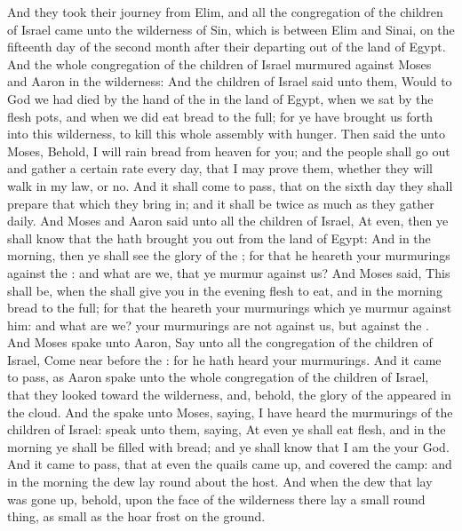 \begin{biblechapter} %
 And they took their journey from Elim, and all the congregation of the children of Israel came unto the wilderness of Sin, which is between Elim and Sinai, on the fifteenth day of the second month after their departing out of the land of Egypt.
\verse And the whole congregation of the children of Israel murmured against Moses and Aaron in the wilderness:
\verse And the children of Israel said unto them, Would to God we had died by the hand of the \LORD in the land of Egypt, when we sat by the flesh pots, and when we did eat bread to the full; for ye have brought us forth into this wilderness, to kill this whole assembly with hunger.
\verse Then said the \LORD unto Moses, Behold, I will rain bread from heaven for you; and the people shall go out and gather a certain rate every day, that I may prove them, whether they will walk in my law, or no.
\verse And it shall come to pass, that on the sixth day they shall prepare that which they bring in; and it shall be twice as much as they gather daily.
\verse And Moses and Aaron said unto all the children of Israel, At even, then ye shall know that the \LORD hath brought you out from the land of Egypt:
\verse And in the morning, then ye shall see the glory of the \LORD; for that he heareth your murmurings against the \LORD: and what are we, that ye murmur against us?
\verse And Moses said, This shall be, when the \LORD shall give you in the evening flesh to eat, and in the morning bread to the full; for that the \LORD heareth your murmurings which ye murmur against him: and what are we? your murmurings are not against us, but against the \LORD.
\verse And Moses spake unto Aaron, Say unto all the congregation of the children of Israel, Come near before the \LORD: for he hath heard your murmurings.
\verse And it came to pass, as Aaron spake unto the whole congregation of the children of Israel, that they looked toward the wilderness, and, behold, the glory of the \LORD appeared in the cloud.
\verse And the \LORD spake unto Moses, saying,
\verse I have heard the murmurings of the children of Israel: speak unto them, saying, At even ye shall eat flesh, and in the morning ye shall be filled with bread; and ye shall know that I am the \LORD your God.
\verse And it came to pass, that at even the quails came up, and covered the camp: and in the morning the dew lay round about the host.
\verse And when the dew that lay was gone up, behold, upon the face of the wilderness there lay a small round thing, as small as the hoar frost on the ground.

\end{biblechapter}
